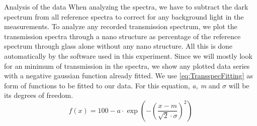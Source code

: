 \documentclass[pdftex, a4paper,11pt, twoside, UKenglish]{report}
\begin{document}
  \begin{chapter}{Analysis of the data}
    \label{chp:Analysis}
    When analyzing the spectra, we have to subtract the dark spectrum from
    all reference spectra to correct for any background light in the
    measurements.
    To analyze any recorded transmission spectrum, we plot the transmission
    spectra through a nano structure as percentage of the reference spectrum
    through glass alone without any nano structure.
    All this is done automatically by the software used in this experiment.
    Since we will mostly look for an minimum of transmission in the spectra,
    we show any plotted data series with a negative gaussian function already
    fitted. We use \cref{eq:TransspecFitting} as form of functions to be fitted
    to our data. For this equation, \textit{a, m} and \textit{$\sigma$} will be
    its degrees of freedom.
    \begin{equation}
      \label{eq:TransspecFitting}
      f(x)=100-a\cdot \exp\left(-\left(\frac{x-m}{\sqrt{2}\cdot\sigma}
      \right)^{2}\right)
    \end{equation}
    

\end{chapter}
\end{document}
